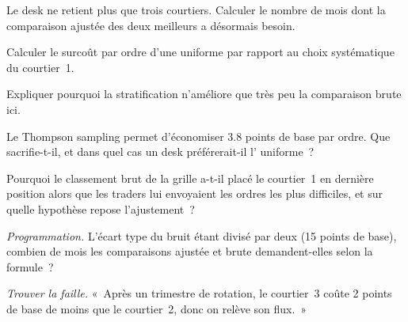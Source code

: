 \begin{exercise}[$\star$]\label{exo:mx:the-buy-side-trading-desk-and-its-brokers:2}
Le desk ne retient plus que trois courtiers. Calculer le nombre de mois dont la comparaison ajustée des deux meilleurs a désormais besoin.
\end{exercise}

\begin{exercise}[$\star$]\label{exo:mx:the-buy-side-trading-desk-and-its-brokers:3}
Calculer le surcoût par ordre d'une  uniforme par rapport au choix systématique du courtier~1.
\end{exercise}

\begin{exercise}[$\star\star$]\label{exo:mx:the-buy-side-trading-desk-and-its-brokers:4}
Expliquer pourquoi la stratification n'améliore que très peu la comparaison brute ici.
\end{exercise}

\begin{exercise}[$\star\star$]\label{exo:mx:the-buy-side-trading-desk-and-its-brokers:5}
Le Thompson sampling permet d'économiser 3.8 points de base par ordre. Que sacrifie-t-il, et dans quel cas un desk préférerait-il l' uniforme~?
\end{exercise}

\begin{exercise}[$\star\star$]\label{exo:mx:the-buy-side-trading-desk-and-its-brokers:6}
Pourquoi le classement brut de la grille a-t-il placé le courtier~1 en dernière position alors que les traders lui envoyaient les ordres les plus difficiles, et sur quelle hypothèse repose l'ajustement~?
\end{exercise}

\begin{exercise}[$\star\star\star$]\label{exo:mx:the-buy-side-trading-desk-and-its-brokers:7}
\emph{Programmation.} L'écart type du bruit étant divisé par deux (15 points de base), combien de mois les comparaisons ajustée et brute demandent-elles selon la formule~?
\end{exercise}

\begin{exercise}[$\star\star\star$]\label{exo:mx:the-buy-side-trading-desk-and-its-brokers:8}
\emph{Trouver la faille.} «~Après un trimestre de rotation, le courtier~3 coûte 2 points de base de moins que le courtier~2, donc on relève son flux.~»
\end{exercise}

